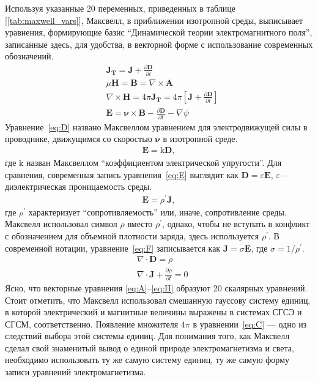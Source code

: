 \documentclass[12pt, oneside, a4paper]{article}
\begin{document}
Используя указанные 20 переменных, приведенных в таблице [\ref{tab:maxwell_vars}], Максвелл, в приближении изотропной среды, выписывает уравнения, формирующие базис ``Динамической теории электромагнитного поля'', записанные здесь, для удобства, в векторной форме с использование современных обозначений.
\begin{align}
&\mathbf{J_T}=\mathbf{J}+\frac{\partial{\mathbf{D}}}{\partial{t}}\label{eq:A}\\
&\mu\mathbf{H} = \mathbf{B} = \nabla\times\mathbf{A}\label{eq:B}\\
&\nabla\times\mathbf{H}=4\pi\mathbf{J_T}=4\pi\left[\mathbf{J}+\frac{\partial{\mathbf{D}}}{\partial{t}}\right]\label{eq:C}\\
&\mathbf{E}=\boldsymbol\nu\times\mathbf{B} - \frac{\partial{\mathbf{D}}}{\partial{t}} - \nabla\psi\label{eq:D}
\end{align}
Уравнение~\eqref{eq:D} названо Максвеллом уравнением для электродвижущей силы в проводнике, движущимся со скоростью $\boldsymbol\nu$ в изотропной среде.
\begin{align}
\mathbf{E}=\mathrm{k}\mathbf{D},\label{eq:E}
\end{align}
где $\mathrm{k}$ назван Максвеллом ``коэффициентом электрической упругости''. Для сравнения, современная запись уравнения~\eqref{eq:E} выглядит как $\mathbf{D}=\varepsilon\mathbf{E}$, $\varepsilon$---диэлектрическая проницаемость среды.
\begin{align}
\mathbf{E}=\rho^{'}\mathbf{J},\label{eq:F}
\end{align}
где $\rho^{'}$ характеризует ``сопротивляемость'' или, иначе, сопротивление среды. Максвелл использовал символ $\rho$ вместо $\rho^{'}$, однако, чтобы не вступать в конфликт с обозначением для объемной плотности заряда, здесь используется $\rho^{'}$. В современной нотации, уравнение~\eqref{eq:F} записывается как $\mathbf{J}=\sigma\mathbf{E}$, где $\sigma=1/\rho^{'}$.
\begin{align}
&\nabla\cdot\mathbf{D}=\rho\label{eq:G}\\
&\nabla\cdot\mathbf{J}+\frac{\partial{\rho}}{\partial{t}}=0\label{eq:H}
\end{align}
Ясно, что векторные уравнения \eqref{eq:A}--\eqref{eq:H} образуют 20 скалярных уравнений. Стоит отметить, что Максвелл использовал смешанную гауссову систему единиц, в которой электрический и магнитные величины выражены в системах СГСЭ и СГСМ, соответственно. Появление множителя $4\pi$ в уравнении~\eqref{eq:C} --- одно из следствий выбора этой системы единиц. Для понимания того, как Максвелл сделал свой знаменитый вывод о единой природе электромагнетизма и света, необходимо использовать ту же самую систему единиц, ту же самую форму записи уравнений электромагнетизма.
\end{document}
